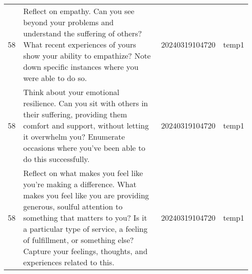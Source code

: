 \begin{longtable}{rlll}
 58 &                                                                                                                                                                                                                                                                                                                                                                                                                                                                                                                                                                                                                                                                                                                                            Reflect on empathy. Can you see beyond your problems and understand the suffering of others? What recent experiences of yours show your ability to empathize? Note down specific instances where you were able to do so. & 20240319104720 &       temp1 \\
 58 &                                                                                                                                                                                                                                                                                                                                                                                                                                                                                                                                                                                                                                                                                                                                        Think about your emotional resilience. Can you sit with others in their suffering, providing them comfort and support, without letting it overwhelm you? Enumerate occasions where you've been able to do this successfully. & 20240319104720 &       temp1 \\
 58 &                                                                                                                                                                                                                                                                                                                                                                                                                                                                                                                                                                                                                                         Reflect on what makes you feel like you're making a difference. What makes you feel like you are providing generous, soulful attention to something that matters to you? Is it a particular type of service, a feeling of fulfillment, or something else? Capture your feelings, thoughts, and experiences related to this. & 20240319104720 &       temp1 \\

\end{longtable}
